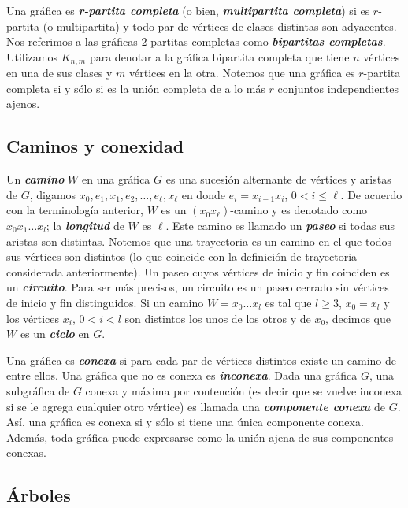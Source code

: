 Una gráfica es \textbf{\emph{r-partita completa}} (o bien, \textbf{\emph{multipartita completa}}) si es $r$-partita (o multipartita) y todo par de vértices de clases distintas son adyacentes. Nos referimos a las gr\'aficas $2$-partitas completas como \textbf{\emph{bipartitas completas}}. Utilizamos $K_{n,m}$ para denotar a la gr\'afica bipartita completa que tiene $n$ v\'ertices en una de sus clases y $m$ v\'ertices en la otra.  Notemos que una gr\'afica es $r$-partita completa si y s\'olo si es la uni\'on completa de a lo m\'as $r$ conjuntos independientes ajenos.

\subsection{Caminos y conexidad}

Un \textbf{\emph{camino}} $W$ en una gráfica $G$ es una sucesi\'on
alternante de vértices y aristas de $G$, digamos $x_0, e_1, x_1, e_2,
\dots, e_\ell, x_\ell$ en donde $e_i = x_{i-1} x_i$, $0 < i \le \ell$. De
acuerdo con la terminología anterior, $W$ es un $(x_0 x_\ell)$-camino y es
denotado como $x_0x_1\dots x_l$; la \textbf{\emph{longitud}} de $W$ es $\ell$.
Este camino es llamado un \textbf{\emph{paseo}} si todas sus aristas son
distintas. Notemos que una trayectoria es un camino en el que todos sus
vértices son distintos (lo que coincide con la definici\'on de trayectoria
considerada anteriormente). Un paseo cuyos vértices de inicio y fin coinciden
es un \textbf{\emph{circuito}}. Para ser más precisos, un circuito es un paseo
cerrado sin vértices de inicio y fin distinguidos. Si un camino $W =
x_0 \dots x_l$ es tal que $l \ge 3$, $x_0 = x_l$ y los vértices $x_i$,
$0<i<l$ son distintos los unos de los otros y de $x_0$, decimos que $W$ es
un \textbf{\emph{ciclo}} en $G$.

Una gráfica es \textbf{\emph{conexa}} si para cada par de vértices
distintos existe un camino de entre ellos. Una gráfica que no es conexa
es \textbf{\emph{inconexa}}. Dada una gráfica $G$, una subgráfica de $G$
conexa y m\'axima por contenci\'on (es decir que se vuelve inconexa si se
le agrega cualquier otro vértice) es llamada una \textbf{\emph{componente
conexa}} de $G$.   As\'i, una gr\'afica es conexa si y s\'olo si tiene
una \'unica componente conexa.   Adem\'as, toda gr\'afica puede expresarse
como la uni\'on ajena de sus componentes conexas.


\subsection{Árboles}

